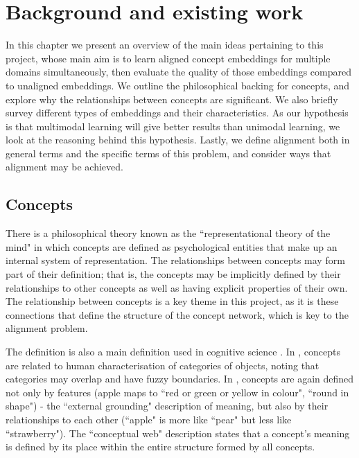 \chapter{Background and existing work}

In this chapter we present an overview of the main ideas pertaining to this project, whose main aim is to learn aligned concept embeddings for multiple domains simultaneously, then evaluate the quality of those embeddings compared to unaligned embeddings. We outline the philosophical backing for concepts, and explore why the relationships between concepts are significant. We also briefly survey different types of embeddings and their characteristics. As our hypothesis is that multimodal learning will give better results than unimodal learning, we look at the reasoning behind this hypothesis. Lastly, we define alignment both in general terms and the specific terms of this problem, and consider ways that alignment may be achieved. 

\section{Concepts}

There is a philosophical theory known as the ``representational theory of the mind" \cite{stanfordconcepts} in which concepts are defined as psychological entities that make up an internal system of representation. The relationships between concepts may form part of their definition; that is, the concepts may be implicitly defined by their relationships to other concepts as well as having explicit properties of their own. The relationship between concepts is a key theme in this project, as it is these connections that define the structure of the concept network, which is key to the alignment problem. 

The \cite{stanfordconcepts} definition is also a main definition used in cognitive science \cite{Pinker2007}. In \cite{NatureOfHumanConcepts}, concepts are related to human characterisation of categories of objects, noting that categories may overlap and have fuzzy boundaries. In \cite{GOLDSTONE2002295}, concepts are again defined not only by features (apple maps to ``red or green or yellow in colour", ``round in shape") - the ``external grounding" description of meaning, but also by their relationships to each other (``apple" is more like ``pear" but less like ``strawberry"). The ``conceptual web" description states that a concept's meaning is defined by its place within the entire structure formed by all concepts. 

